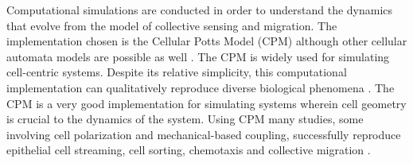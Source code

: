 Computational simulations are conducted in order to understand the dynamics that evolve from the model of collective sensing and migration. The implementation chosen is the Cellular Potts Model (CPM) \cite{graner1992simulation,swat2012multi} although other cellular automata models are possible as well \cite{ermentrout1993cellular,maire2015molecular,mente2015analysis}. The CPM is widely used for simulating cell-centric systems. Despite its relative simplicity, this computational implementation can qualitatively reproduce diverse biological phenomena \cite{maree2007cellular}. The CPM is a very good implementation for simulating systems wherein cell geometry is crucial to the dynamics of the system.
Using CPM many studies, some involving cell polarization and mechanical-based coupling, successfully reproduce epithelial cell streaming, cell sorting, chemotaxis and collective migration \cite{maclaren2015models,kabla2012collective,szabo2010collective}.

